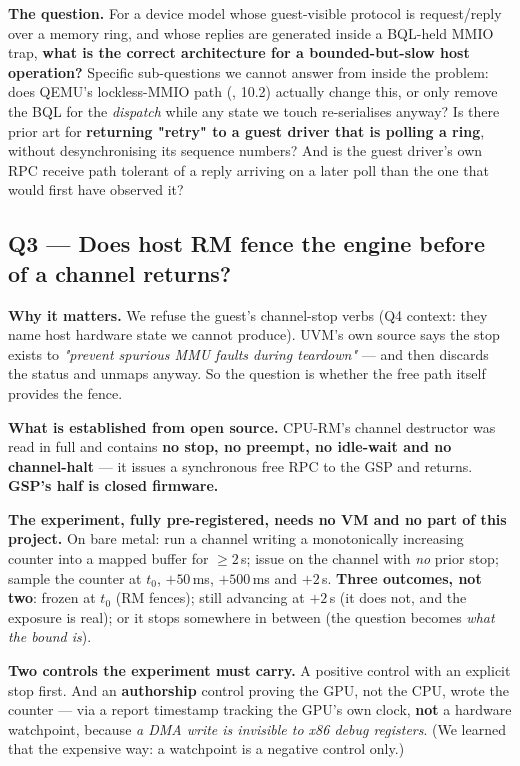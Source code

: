 \documentclass[10.5pt]{article}
\begin{document}
\textbf{The question.} For a device model whose guest-visible protocol is request/reply over a
memory ring, and whose replies are generated inside a BQL-held MMIO trap, \textbf{what is the
correct architecture for a bounded-but-slow host operation?} Specific sub-questions we cannot
answer from inside the problem: does QEMU's lockless-MMIO path (,
10.2) actually change this, or only remove the BQL for the \emph{dispatch} while any state we
touch re-serialises anyway? Is there prior art for \textbf{returning "retry" to a guest driver
that is polling a ring}, without desynchronising its sequence numbers? And is the guest driver's
own RPC receive path tolerant of a reply arriving on a later poll than the one that would first
have observed it?

\subsection*{Q3 --- Does host RM fence the engine before  of a channel returns?}

\textbf{Why it matters.} We refuse the guest's channel-stop verbs (Q4 context: they name host
hardware state we cannot produce). UVM's own source says the stop exists to \emph{"prevent
spurious MMU faults during teardown"} — and then discards the status and unmaps anyway. So the
question is whether the free path itself provides the fence.

\textbf{What is established from open source.} CPU-RM's channel destructor was read in full and
contains \textbf{no stop, no preempt, no idle-wait and no channel-halt} — it issues a synchronous
free RPC to the GSP and returns. \textbf{GSP's half is closed firmware.}

\textbf{The experiment, fully pre-registered, needs no VM and no part of this project.} On bare
metal: run a channel writing a monotonically increasing counter into a mapped buffer for
$\geq 2$\,s; issue  on the channel with \emph{no} prior stop; sample the counter
at $t_0$, $+50$\,ms, $+500$\,ms and $+2$\,s. \textbf{Three outcomes, not two}: frozen at $t_0$
(RM fences); still advancing at $+2$\,s (it does not, and the exposure is real); or it stops
somewhere in between (the question becomes \emph{what the bound is}).

\textbf{Two controls the experiment must carry.} A positive control with an explicit stop first.
And an \textbf{authorship} control proving the GPU, not the CPU, wrote the counter — via a report
timestamp tracking the GPU's own clock, \textbf{not} a hardware watchpoint, because \emph{a DMA
write is invisible to x86 debug registers}. (We learned that the expensive way: a watchpoint is a
negative control only.)
\end{document}
